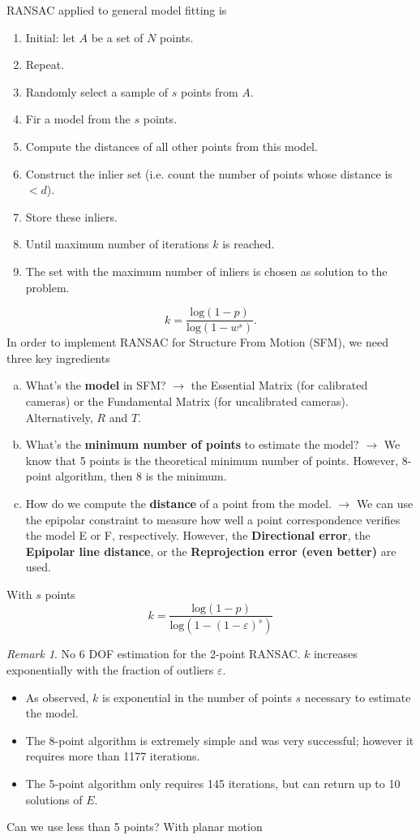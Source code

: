 \documentclass[a4paper,12 pt]{article}
\theoremstyle{definition}
\theoremstyle{remark}
\newtheorem*{bmk}{Remark}
\theoremstyle{definition}
\theoremstyle{definition}
\theoremstyle{definition}
\theoremstyle{remark}
\theoremstyle{definition}
\begin{document}
RANSAC applied to general model fitting is
\begin{enumerate}
\item Initial: let $A$ be a set of $N$ points.
\item Repeat.
\item Randomly select a sample of $s$ points from $A$.
\item Fir a model from the $s$ points.
\item Compute the distances of all other points from this model.
\item Construct the inlier set (i.e. count the number of points whose distance is $<d$).
\item Store these inliers.
\item Until maximum number of iterations $k$ is reached.
\item The set with the maximum number of inliers is chosen as solution to the problem.
\end{enumerate}
\begin{equation}
k=\frac{\text{log}(1-p)}{\text{log}(1-w^s)}.
\end{equation}
In order to implement RANSAC for Structure From Motion (SFM), we need three key ingredients
\begin{enumerate}[a)]
\item What's the \textbf{model} in SFM? $\rightarrow$ the Essential Matrix (for calibrated cameras) or the Fundamental Matrix (for uncalibrated cameras). Alternatively, $R$ and $T$.
\item What's the \textbf{minimum number of points} to estimate the model? $\rightarrow$ We know that 5 points is the theoretical minimum number of points. However, 8-point algorithm, then 8 is the minimum.
\item How do we compute the \textbf{distance} of a point from the model. $\rightarrow$  We can use the epipolar constraint to measure how well a point correspondence verifies the model E or F, respectively. However, the \textbf{Directional error}, the \textbf{Epipolar line distance}, or the \textbf{Reprojection error (even better)} are used.
\end{enumerate}
With $s$ points
\begin{equation}
k=\frac{\text{log}(1-p)}{\text{log}(1-(1-\varepsilon)^s)}
\end{equation}
\begin{bmk}
No 6 DOF estimation for the 2-point RANSAC. $k$ increases exponentially with the fraction of outliers $\varepsilon$.
\end{bmk}
\begin{itemize}
\item As observed, $k$ is exponential in the number of points $s$ necessary to estimate the model.
\item The 8-point algorithm is extremely simple and was very successful; however it requires more than 1177 iterations.
\item The 5-point algorithm only requires 145 iterations, but can return up to 10 solutions of $E$.
\end{itemize}
Can we use less than 5 points? With planar motion
\end{document}
